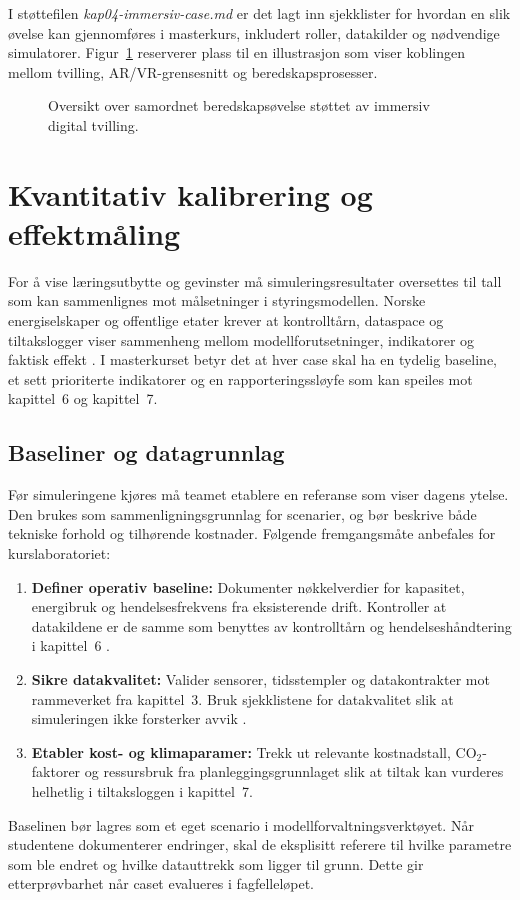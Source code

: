 I støttefilen \textit{kap04-immersiv-case.md} er det lagt inn sjekklister for hvordan en slik øvelse kan gjennomføres i masterkurs, inkludert roller, datakilder og nødvendige simulatorer. Figur~\ref{fig:kap04-beredskap-case} reserverer plass til en illustrasjon som viser koblingen mellom tvilling, AR/VR-grensesnitt og beredskapsprosesser.

\begin{figure}[htbp]
    \centering
    \caption{Oversikt over samordnet beredskapsøvelse støttet av immersiv digital tvilling.}
    \label{fig:kap04-beredskap-case}
\end{figure}

\section{Kvantitativ kalibrering og effektmåling}
For å vise læringsutbytte og gevinster må simuleringsresultater oversettes til tall som kan sammenlignes mot målsetninger i styringsmodellen. Norske energiselskaper og offentlige etater krever at kontrolltårn, dataspace og tiltakslogger viser sammenheng mellom modellforutsetninger, indikatorer og faktisk effekt \citep{energinorge2023beredskap,statnett2024kontrolltarn}. I masterkurset betyr det at hver case skal ha en tydelig baseline, et sett prioriterte indikatorer og en rapporteringssløyfe som kan speiles mot kapittel~6 og kapittel~7.

\subsection{Baseliner og datagrunnlag}
Før simuleringene kjøres må teamet etablere en referanse som viser dagens ytelse. Den brukes som sammenligningsgrunnlag for scenarier, og bør beskrive både tekniske forhold og tilhørende kostnader. Følgende fremgangsmåte anbefales for kurslaboratoriet:
\begin{enumerate}
    \item \textbf{Definer operativ baseline:} Dokumenter nøkkelverdier for kapasitet, energibruk og hendelsesfrekvens fra eksisterende drift. Kontroller at datakildene er de samme som benyttes av kontrolltårn og hendelseshåndtering i kapittel~6 \citep{statnett2024kontrolltarn}.
    \item \textbf{Sikre datakvalitet:} Valider sensorer, tidsstempler og datakontrakter mot rammeverket fra kapittel~3. Bruk sjekklistene for datakvalitet slik at simuleringen ikke forsterker avvik \citep{energinorge2023beredskap}.
    \item \textbf{Etabler kost- og klimaparamer:} Trekk ut relevante kostnadstall, CO$_2$-faktorer og ressursbruk fra planleggingsgrunnlaget slik at tiltak kan vurderes helhetlig i tiltaksloggen i kapittel~7.
\end{enumerate}
Baselinen bør lagres som et eget scenario i modellforvaltningsverktøyet. Når studentene dokumenterer endringer, skal de eksplisitt referere til hvilke parametre som ble endret og hvilke datauttrekk som ligger til grunn. Dette gir etterprøvbarhet når caset evalueres i fagfelleløpet.

